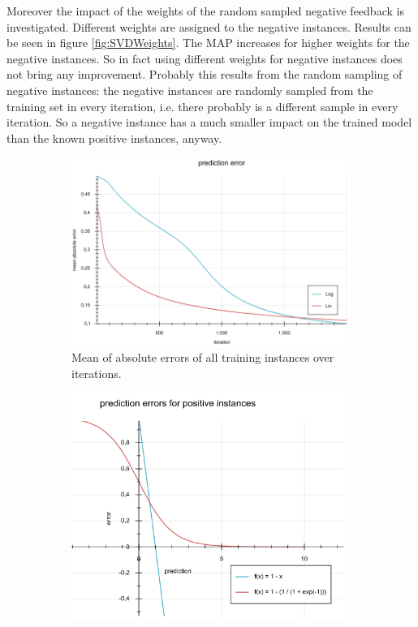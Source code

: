 \documentclass[10pt]{reportMaster}
\begin{document}
Moreover the impact of the weights of the random sampled negative feedback is investigated.
Different weights are assigned to the negative instances.
Results can be seen in figure \ref{fig:SVDWeights}.
The MAP increases for higher weights for the negative instances.
So in fact using different weights for negative instances does not bring any improvement.
Probably this results from the random sampling 
of negative instances: the negative instances are randomly sampled from the training set in every iteration, i.e. there probably is a different sample in every iteration.
So a negative instance has a much smaller impact on the trained model than the known positive instances, anyway.

\begin{figure}
	\begin{subfigure}{0.5\textwidth}
		\centering
		\includegraphics[width=1\textwidth]{figures/experiments/errorsLogLin43}
		\caption{Mean of absolute errors of all training instances over iterations.}
		\label{fig:errorsLogLin43}
	\end{subfigure}
	\begin{subfigure}{0.5\textwidth}
		\centering
		\includegraphics[width=1\textwidth]{figures/experiments/predictionErrors}

\end{subfigure}
\end{figure}
\end{document}
